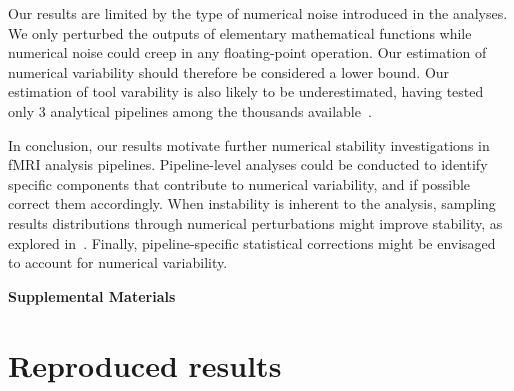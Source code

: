 \documentclass[11pt,onecolumn]{article}
\begin{document}
Our results are limited by the type of numerical noise introduced in the
analyses. We only perturbed the outputs of elementary
mathematical functions while numerical noise could creep in any
floating-point operation. Our estimation of numerical variability should
therefore be considered a lower bound. Our estimation of tool varability is
also likely to be underestimated, having tested only 3 analytical pipelines
among the thousands available~\cite{carp2012plurality}.

In conclusion, our results motivate further numerical stability
investigations in fMRI analysis pipelines. Pipeline-level analyses could be
conducted to identify specific components that contribute to numerical
variability, and if possible correct them accordingly. When instability is
inherent to the analysis, sampling results distributions through numerical
perturbations might improve stability, as explored in~\cite{kiar2021data}.
Finally, pipeline-specific statistical corrections might be envisaged to
account for numerical variability.




\clearpage

\setcounter{equation}{0}
\setcounter{figure}{0}
\setcounter{table}{0}
\setcounter{section}{0}

\makeatletter
\renewcommand{\theequation}{S\arabic{equation}}
\renewcommand{\thefigure}{S\arabic{figure}}
\renewcommand{\thesection}{S\arabic{section}}

\textbf{\centering \Large Supplemental Materials}

\section{Reproduced results}
\label{sec:supp-repro}
\end{document}
